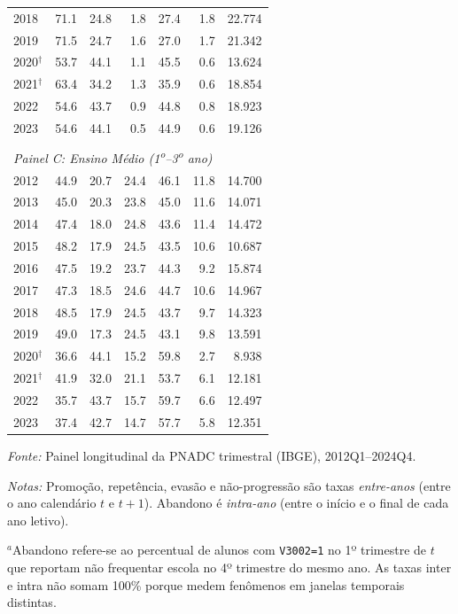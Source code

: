 \begin{table}[htbp]
\begin{threeparttable}
\begin{tabular}{lrrrrrr}
2018 & 71.1 & 24.8 & 1.8 & 27.4 & 1.8 & 22.774 \\
2019 & 71.5 & 24.7 & 1.6 & 27.0 & 1.7 & 21.342 \\
2020$^{\dagger}$ & 53.7 & 44.1 & 1.1 & 45.5 & 0.6 & 13.624 \\
2021$^{\dagger}$ & 63.4 & 34.2 & 1.3 & 35.9 & 0.6 & 18.854 \\
2022 & 54.6 & 43.7 & 0.9 & 44.8 & 0.8 & 18.923 \\
2023 & 54.6 & 44.1 & 0.5 & 44.9 & 0.6 & 19.126 \\
\\[0.3em]
\multicolumn{7}{l}{\textit{Painel C: Ensino M\'edio (1\textsuperscript{o}--3\textsuperscript{o} ano)}} \\
\midrule
2012 & 44.9 & 20.7 & 24.4 & 46.1 & 11.8 & 14.700 \\
2013 & 45.0 & 20.3 & 23.8 & 45.0 & 11.6 & 14.071 \\
2014 & 47.4 & 18.0 & 24.8 & 43.6 & 11.4 & 14.472 \\
2015 & 48.2 & 17.9 & 24.5 & 43.5 & 10.6 & 10.687 \\
2016 & 47.5 & 19.2 & 23.7 & 44.3 & 9.2 & 15.874 \\
2017 & 47.3 & 18.5 & 24.6 & 44.7 & 10.6 & 14.967 \\
2018 & 48.5 & 17.9 & 24.5 & 43.7 & 9.7 & 14.323 \\
2019 & 49.0 & 17.3 & 24.5 & 43.1 & 9.8 & 13.591 \\
2020$^{\dagger}$ & 36.6 & 44.1 & 15.2 & 59.8 & 2.7 & 8.938 \\
2021$^{\dagger}$ & 41.9 & 32.0 & 21.1 & 53.7 & 6.1 & 12.181 \\
2022 & 35.7 & 43.7 & 15.7 & 59.7 & 6.6 & 12.497 \\
2023 & 37.4 & 42.7 & 14.7 & 57.7 & 5.8 & 12.351 \\
\bottomrule
\end{tabular}
\begin{tablenotes}\footnotesize
\item \textit{Fonte:} Painel longitudinal da PNADC trimestral (IBGE), 2012Q1--2024Q4.
\item \textit{Notas:} Promoção, repetência, evasão e não-progressão são taxas \emph{entre-anos} (entre o ano calendário $t$ e $t+1$). Abandono é \emph{intra-ano} (entre o início e o final de cada ano letivo).
\item $^{a}$Abandono refere-se ao percentual de alunos com \texttt{V3002=1} no 1º trimestre de $t$ que reportam não frequentar escola no 4º trimestre do mesmo ano. As taxas inter e intra não somam 100\% porque medem fenômenos em janelas temporais distintas.

\end{tablenotes}
\end{threeparttable}
\end{table}
